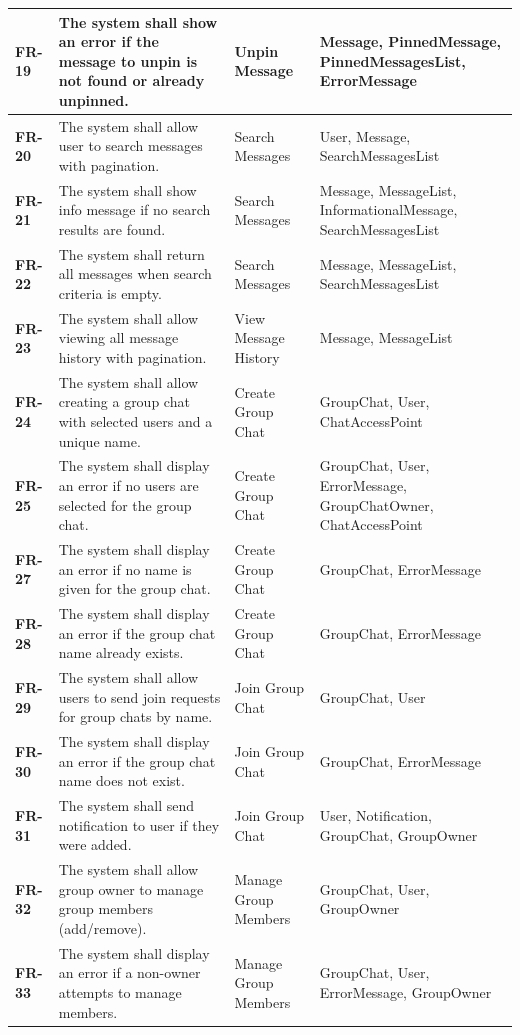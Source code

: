 \begin{longtable}{|p{3cm}|p{5.5cm}|l|p{4cm}|}
\hline
\textbf{FR-19} & The system shall show an error if the message to unpin is not found or already unpinned. & Unpin Message & Message, PinnedMessage, PinnedMessagesList, ErrorMessage \\
\hline
\textbf{FR-20} & The system shall allow user to search messages with pagination. & Search Messages & User, Message, SearchMessagesList \\
\hline
\textbf{FR-21} & The system shall show info message if no search results are found. & Search Messages & Message, MessageList, InformationalMessage, SearchMessagesList \\
\hline
\textbf{FR-22} & The system shall return all messages when search criteria is empty. & Search Messages & Message, MessageList, SearchMessagesList \\
\hline
\textbf{FR-23} & The system shall allow viewing all message history with pagination. & View Message History & Message, MessageList \\
\hline
\textbf{FR-24} & The system shall allow creating a group chat with selected users and a unique name. & Create Group Chat & GroupChat, User, ChatAccessPoint \\
\hline
\textbf{FR-25} & The system shall display an error if no users are selected for the group chat. & Create Group Chat & GroupChat, User, ErrorMessage, GroupChatOwner, ChatAccessPoint \\
\hline
\textbf{FR-27} & The system shall display an error if no name is given for the group chat. & Create Group Chat & GroupChat, ErrorMessage \\
\hline
\textbf{FR-28} & The system shall display an error if the group chat name already exists. & Create Group Chat & GroupChat, ErrorMessage \\
\hline
\textbf{FR-29} & The system shall allow users to send join requests for group chats by name. & Join Group Chat & GroupChat, User \\
\hline
\textbf{FR-30} & The system shall display an error if the group chat name does not exist. & Join Group Chat & GroupChat, ErrorMessage \\
\hline
\textbf{FR-31} & The system shall send notification to user if they were added. & Join Group Chat & User, Notification, GroupChat, GroupOwner \\
\hline
\textbf{FR-32} & The system shall allow group owner to manage group members (add/remove). & Manage Group Members & GroupChat, User, GroupOwner  \\
\hline
\textbf{FR-33} & The system shall display an error if a non-owner attempts to manage members. & Manage Group Members & GroupChat, User, ErrorMessage, GroupOwner  \\

\end{longtable}
